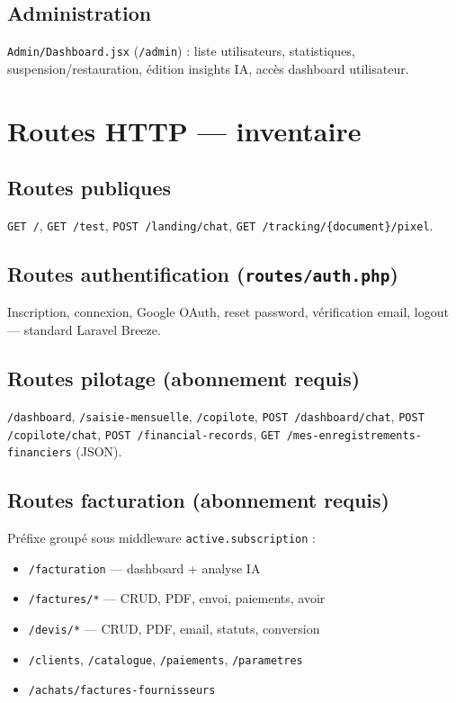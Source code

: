 \documentclass[11pt,a4paper]{report}
\newcommand{\filepath}[1]{\texttt{\small #1}}
\begin{document}
\section{Administration}

\filepath{Admin/Dashboard.jsx} (\texttt{/admin}) : liste utilisateurs, statistiques, suspension/restauration, édition insights IA, accès dashboard utilisateur.

\chapter{Routes HTTP — inventaire}

\section{Routes publiques}

\texttt{GET /}, \texttt{GET /test}, \texttt{POST /landing/chat}, \texttt{GET /tracking/\{document\}/pixel}.

\section{Routes authentification (\filepath{routes/auth.php})}

Inscription, connexion, Google OAuth, reset password, vérification email, logout — standard Laravel Breeze.

\section{Routes pilotage (abonnement requis)}

\texttt{/dashboard}, \texttt{/saisie-mensuelle}, \texttt{/copilote}, \texttt{POST /dashboard/chat}, \texttt{POST /copilote/chat}, \texttt{POST /financial-records}, \texttt{GET /mes-enregistrements-financiers} (JSON).

\section{Routes facturation (abonnement requis)}

Préfixe groupé sous middleware \texttt{active.subscription} :

\begin{itemize}[leftmargin=1.5em]
    \item \texttt{/facturation} — dashboard + analyse IA
    \item \texttt{/factures/*} — CRUD, PDF, envoi, paiements, avoir
    \item \texttt{/devis/*} — CRUD, PDF, email, statuts, conversion
    \item \texttt{/clients}, \texttt{/catalogue}, \texttt{/paiements}, \texttt{/parametres}
    \item \texttt{/achats/factures-fournisseurs}
\end{itemize}
\end{document}
